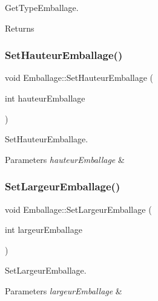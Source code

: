 Get\+Type\+Emballage. 

\begin{DoxyReturn}{Returns}

\end{DoxyReturn}
\mbox{\label{class_emballage_a8a91d921f0cb30c14bbbec3858b2dfce}} 
\subsubsection{\texorpdfstring{Set\+Hauteur\+Emballage()}{SetHauteurEmballage()}}
{\footnotesize\ttfamily void Emballage\+::\+Set\+Hauteur\+Emballage (\begin{DoxyParamCaption}\item[{int}]{hauteur\+Emballage }\end{DoxyParamCaption})}



Set\+Hauteur\+Emballage. 


\begin{DoxyParams}{Parameters}
{\em hauteur\+Emballage} & \\
\hline
\end{DoxyParams}
\mbox{\label{class_emballage_ac6733f3663c253d4cbfbeb467a35dfc1}} 
\subsubsection{\texorpdfstring{Set\+Largeur\+Emballage()}{SetLargeurEmballage()}}
{\footnotesize\ttfamily void Emballage\+::\+Set\+Largeur\+Emballage (\begin{DoxyParamCaption}\item[{int}]{largeur\+Emballage }\end{DoxyParamCaption})}



Set\+Largeur\+Emballage. 


\begin{DoxyParams}{Parameters}
{\em largeur\+Emballage} & \\
\hline
\end{DoxyParams}
\mbox{\label{class_emballage_ad6d542ac95bc816d87816e9b5eb5ce0b}} 
